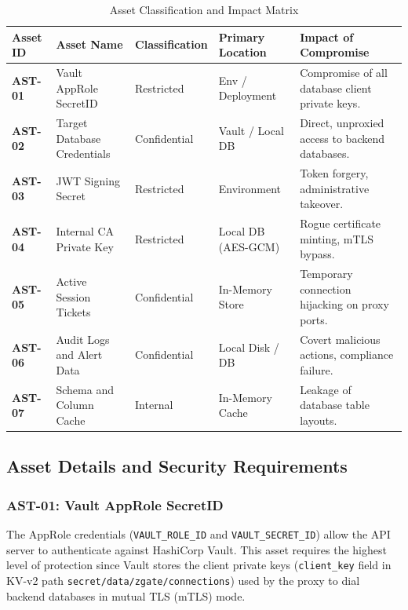 \begin{table}[H]
\centering
\small
\renewcommand{\arraystretch}{1.2}
\begin{tabularx}{\textwidth}{l p{3.8cm} l p{2.2cm} X}
\toprule
\textbf{Asset ID} & \textbf{Asset Name} & \textbf{Classification} & \textbf{Primary Location} & \textbf{Impact of Compromise} \\
\midrule
\textbf{AST-01} & Vault AppRole SecretID & Restricted & Env / Deployment & Compromise of all database client private keys. \\
\textbf{AST-02} & Target Database Credentials & Confidential & Vault / Local DB & Direct, unproxied access to backend databases. \\
\textbf{AST-03} & JWT Signing Secret & Restricted & Environment & Token forgery, administrative takeover. \\
\textbf{AST-04} & Internal CA Private Key & Restricted & Local DB (AES-GCM) & Rogue certificate minting, mTLS bypass. \\
\textbf{AST-05} & Active Session Tickets & Confidential & In-Memory Store & Temporary connection hijacking on proxy ports. \\
\textbf{AST-06} & Audit Logs and Alert Data & Confidential & Local Disk / DB & Covert malicious actions, compliance failure. \\
\textbf{AST-07} & Schema and Column Cache & Internal & In-Memory Cache & Leakage of database table layouts. \\
\bottomrule
\end{tabularx}
\caption{Asset Classification and Impact Matrix}
\label{tab:assets}
\end{table}

\subsection{Asset Details and Security Requirements}

\subsubsection{AST-01: Vault AppRole SecretID}
The AppRole credentials (\texttt{VAULT\_ROLE\_ID} and \texttt{VAULT\_SECRET\_ID}) allow the API server to authenticate against HashiCorp Vault. This asset requires the highest level of protection since Vault stores the client private keys (\texttt{client\_key} field in KV-v2 path \texttt{secret/data/zgate/connections}) used by the proxy to dial backend databases in mutual TLS (mTLS) mode.


